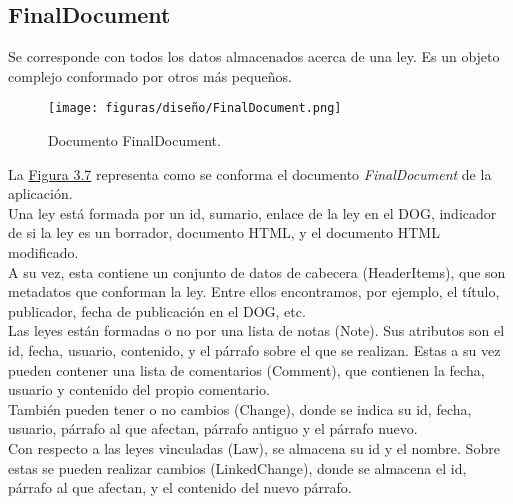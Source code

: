 \subsection{FinalDocument}

Se corresponde con todos los datos almacenados acerca de una ley. Es un objeto complejo conformado por otros más pequeños.

\begin{figure}[H]
\centerline{\texttt{[image: figuras/diseño/FinalDocument.png]}}
\caption{Documento FinalDocument.}
\label{enlaceFinalDocument}
\end{figure}

La \hyperref[enlaceFinalDocument]{Figura 3.7} representa como se conforma el documento {\it FinalDocument} de la aplicación.
\\

Una ley está formada por un id, sumario, enlace de la ley en el DOG, indicador de si la ley es un borrador, documento HTML, y el documento HTML modificado. 
\\

A su vez, esta contiene un conjunto de datos de cabecera (HeaderItems), que son metadatos que conforman la ley. Entre ellos encontramos, por ejemplo, el título, publicador, fecha de publicación en el DOG, etc.
\\

Las leyes están formadas o no por una lista de notas (Note). Sus atributos son el id, fecha, usuario, contenido, y el párrafo sobre el que se realizan. Estas a su vez pueden contener una lista de comentarios (Comment), que contienen la fecha, usuario y contenido del propio comentario.
\\

También pueden tener o no cambios (Change), donde se indica su id, fecha, usuario, párrafo al que afectan, párrafo antiguo y el párrafo nuevo.
\\

Con respecto a las leyes vinculadas (Law), se almacena su id y el nombre. Sobre estas se pueden realizar cambios (LinkedChange), donde se almacena el id, párrafo al que afectan, y el contenido del nuevo párrafo.